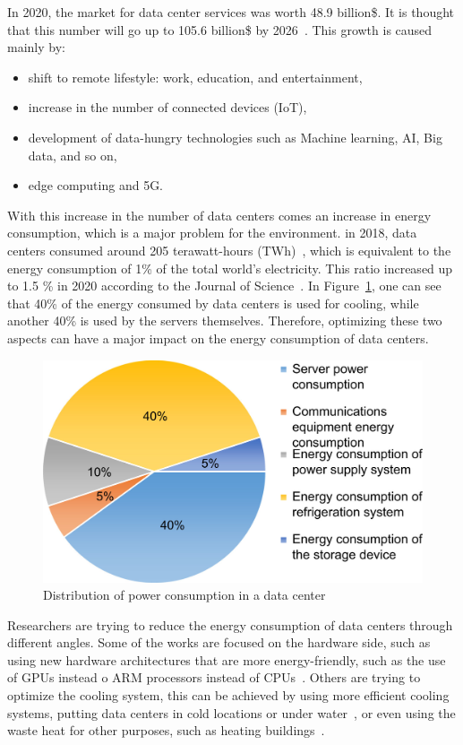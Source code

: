 In 2020, the market for data center services was worth 48.9 billion\$.
It is thought that this number will go up to 105.6 billion\$ by 2026~\cite{inshakova2022data}.
This growth is caused mainly by:
\begin{itemize}
    \item shift to remote lifestyle: work, education, and entertainment,
    \item increase in the number of connected devices (IoT),
    \item development of data-hungry technologies such as Machine learning, AI, Big data, and so on,
    \item edge computing and 5G.
\end{itemize}

With this increase in the number of data centers comes an increase in energy consumption, which is a major problem for the environment.
in 2018, data centers consumed around 205 terawatt-hours (TWh)~\cite{schneider2021world}, which is equivalent to the energy consumption of 1\% of the total world's electricity.
This ratio increased up to 1.5 \% in 2020 according to the Journal of Science~\cite{mytton2021data}.
In Figure~\ref{fig:data_centers_power_distribution}, one can see that 40\% of the energy consumed by data centers is used for cooling, while another 40\% is used by the servers themselves.
Therefore, optimizing these two aspects can have a major impact on the energy consumption of data centers.

\begin{figure}[!h]
    \centering
    \includegraphics[width=0.6\linewidth]{chapters/data_centers_power_distribution}
    \caption{Distribution of power consumption in a data center~\cite{rong2016optimizing}}
    \label{fig:data_centers_power_distribution}
\end{figure}

Researchers are trying to reduce the energy consumption of data centers through different angles.
Some of the works are focused on the hardware side, such as using new hardware architectures that are more energy-friendly, such as the use of GPUs instead o ARM processors instead of CPUs~\cite{aroca2012towards}.
Others are trying to optimize the cooling system, this can be achieved by using more efficient cooling systems, putting data centers in cold locations or under water~\cite{simon2018project}, or even using the waste heat for other purposes, such as heating buildings~\cite{bouzel2021distributed,cao2021carbon}.

